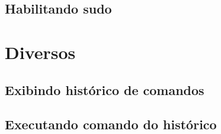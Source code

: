 \documentclass[a4paper,8pt]{extarticle}
\begin{document}
\begin{multicols}{2}
\subsection{Habilitando sudo}

\section{Diversos}
\subsection{Exibindo histórico de comandos}
\subsection{Executando comando do histórico}



\end{multicols}
\end{document}
